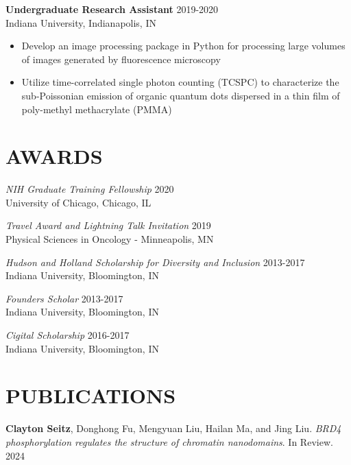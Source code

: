 \documentclass[margin, 10pt]{res} %
\begin{document}
\begin{resume}
\begin{itemize}
\end{itemize}
 
\textbf{Undergraduate Research Assistant} \hfill 2019-2020\\
Indiana University, Indianapolis, IN
\begin{itemize} \itemsep -2pt %

\item Develop an image processing package in Python for processing large volumes of images generated by fluorescence microscopy

\item Utilize time-correlated single photon counting (TCSPC) to characterize the sub-Poissonian emission of organic quantum dots dispersed in a thin film of poly-methyl methacrylate (PMMA)


\end{itemize} 



\section{AWARDS}

{\sl NIH Graduate Training Fellowship} \hfill 2020 \\
University of Chicago, Chicago, IL

{\sl Travel Award and Lightning Talk Invitation} \hfill 2019 \\
Physical Sciences in Oncology - Minneapolis, MN

{\sl Hudson and Holland Scholarship for Diversity and Inclusion} \hfill 2013-2017 \\
Indiana University, Bloomington, IN 

{\sl Founders Scholar} \hfill 2013-2017 \\
Indiana University, Bloomington, IN 

{\sl Cigital Scholarship} \hfill 2016-2017 \\
Indiana University, Bloomington, IN 

\section{PUBLICATIONS}

\textbf{Clayton Seitz}\textsuperscript{\textdagger}, Donghong Fu\textsuperscript{\textdagger}, Mengyuan Liu, Hailan Ma, and Jing Liu. \textit{BRD4 phosphorylation regulates the structure of chromatin nanodomains}. In Review. 2024


\end{resume}
\end{document}
